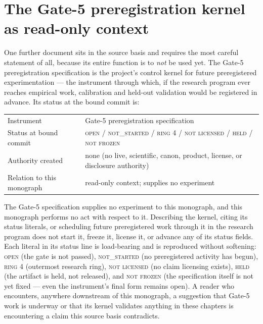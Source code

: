 \section{The Gate-5 preregistration kernel as read-only context}\label{ch03:gate5}

One further document sits in the source basis and requires the most
careful statement of all, because its entire function is to \emph{not}
be used yet. The Gate-5 preregistration specification is the project's
control kernel for future preregistered experimentation --- the
instrument through which, if the research program ever reaches
empirical work, calibration and held-out validation would be registered
in advance. Its status at the bound commit is:

\begin{center}
\begin{tabular}{@{}ll@{}}
\toprule
Instrument & Gate-5 preregistration specification \\
Status at bound commit & \textsc{open / not\_started / ring 4 / not licensed / held / not frozen} \\
Authority created & none (no live, scientific, canon, product, license, or disclosure authority) \\
Relation to this monograph & read-only context; supplies no experiment \\
\bottomrule
\end{tabular}
\end{center}

\begin{boundary}\label{ch03:bnd:gate5}
The Gate-5 specification supplies no experiment to this monograph, and
this monograph performs no act with respect to it. Describing the
kernel, citing its status literals, or scheduling future preregistered
work through it in the research program does not start it, freeze it,
license it, or advance any of its status fields. Each literal in its
status line is load-bearing and is reproduced without softening:
\textsc{open} (the gate is not passed), \textsc{not\_started} (no
preregistered activity has begun), \textsc{ring 4} (outermost research
ring), \textsc{not licensed} (no claim licensing exists),
\textsc{held} (the artifact is held, not released), and
\textsc{not frozen} (the specification itself is not yet fixed ---
even the instrument's final form remains open). A reader who
encounters, anywhere downstream of this monograph, a suggestion that
Gate-5 work is underway or that its kernel validates anything in these
chapters is encountering a claim this source basis contradicts.
\end{boundary}

